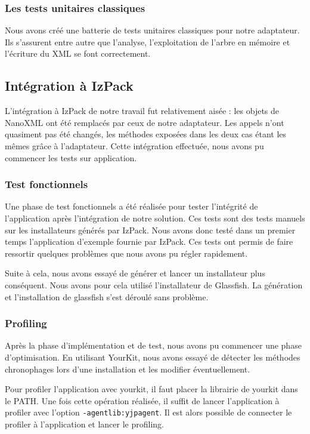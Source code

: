 \subsubsection{Les tests unitaires classiques}
Nous avons créé une batterie de tests unitaires classiques pour notre adaptateur.
Ils s'assurent entre autre que l'analyse, l'exploitation de l'arbre en mémoire et l'écriture du XML se font correctement.

\subsection{Intégration à IzPack}
L'intégration à IzPack de notre travail fut relativement aisée : les objets de NanoXML ont été remplacés par ceux de notre adaptateur.
Les appels n'ont quasiment pas été changés, les méthodes exposées dans les deux cas étant les mêmes grâce à l'adaptateur.
Cette intégration effectuée, nous avons pu commencer les tests sur application.
\subsubsection{Test fonctionnels}
Une phase de test fonctionnels a été réalisée pour tester l'intégrité de l'application après l'intégration de notre solution.
Ces tests sont des tests manuels sur les installateurs générés par IzPack.
Nous avons donc testé dans un premier temps l'application d'exemple fournie par IzPack.
Ces tests ont permis de faire ressortir quelques problèmes que nous avons pu régler rapidement.

Suite à cela, nous avons essayé de générer et lancer un installateur plus conséquent.
Nous avons pour cela utilisé l'installateur de Glassfish.
La génération et l'installation de glassfish s'est déroulé sans problème.
\subsubsection{Profiling}
Après la phase d'implémentation et de test, nous avons pu commencer une phase d'optimisation.
En utilisant YourKit, nous avons essayé de détecter les méthodes chronophages lors d'une installation et les modifier éventuellement.

Pour profiler l'application avec yourkit, il faut placer la librairie de yourkit dans le PATH.
Une fois cette opération réalisée, il suffit de lancer l'application à profiler avec l'option \verb|-agentlib:yjpagent|.
Il est alors possible de connecter le profiler à l'application et lancer le profiling.

